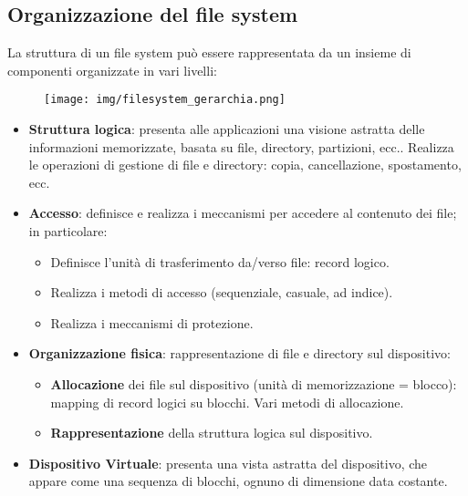 \documentclass{article}
\begin{document}
 \subsection{Organizzazione del file system}
La struttura di un file system  può essere rappresentata da
un insieme di componenti organizzate in vari livelli:

\begin{figure}[h!]
    \begin{center}
        \texttt{[image: img/filesystem\_gerarchia.png]}      \end{center}
\end{figure}

\begin{itemize}
    \item \textbf{Struttura logica}: presenta alle applicazioni
    una visione astratta delle informazioni memorizzate,
    basata su file, directory, partizioni, ecc..
    Realizza le operazioni di gestione di file e directory:
    copia, cancellazione, spostamento, ecc.
    \item \textbf{Accesso}: definisce e realizza i meccanismi
    per accedere al contenuto dei file; in particolare:
        \begin{itemize}
            \item Definisce l'unità di trasferimento da/verso file:
            record logico.
            \item Realizza i metodi di accesso (sequenziale,
            casuale, ad indice).
            \item Realizza i meccanismi di protezione.
        \end{itemize}
    \item \textbf{Organizzazione fisica}: rappresentazione di
    file e directory sul dispositivo:
        \begin{itemize}
            \item \textbf{Allocazione} dei file sul
            dispositivo (unità di memorizzazione = blocco):
            mapping di record logici su blocchi. Vari metodi
            di allocazione.
            \item \textbf{Rappresentazione} della struttura 
            logica sul dispositivo.
        \end{itemize}
    \item \textbf{Dispositivo Virtuale}: presenta una vista astratta del dispositivo, che
    appare come una sequenza di blocchi, ognuno di dimensione data
    costante.
\end{itemize}
\end{document}
